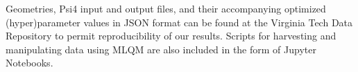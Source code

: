 Geometries, Psi4 input and output files, and their accompanying optimized (hyper)parameter values in JSON format can be found at the Virginia Tech Data Repository\cite{vtdata2020}   
to permit reproducibility of our results. Scripts for harvesting and manipulating data using MLQM are also included in the form of Jupyter Notebooks.
